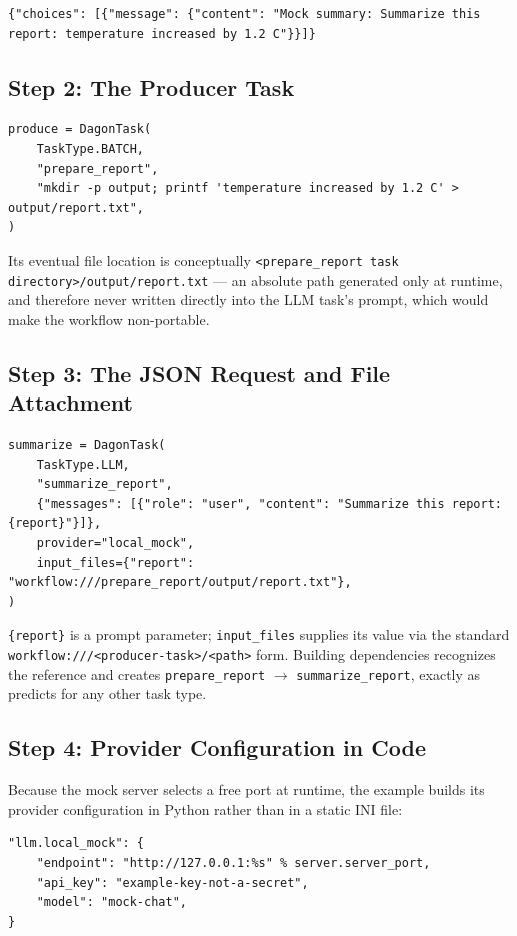 \begin{lstlisting}
{"choices": [{"message": {"content": "Mock summary: Summarize this report: temperature increased by 1.2 C"}}]}
\end{lstlisting}

\subsection{Step 2: The Producer Task}

\begin{lstlisting}
produce = DagonTask(
    TaskType.BATCH,
    "prepare_report",
    "mkdir -p output; printf 'temperature increased by 1.2 C' > output/report.txt",
)
\end{lstlisting}

Its eventual file location is conceptually
\texttt{<prepare\_report task directory>/output/report.txt} --- an absolute
path generated only at runtime, and therefore never written directly into
the LLM task's prompt, which would make the workflow non-portable.

\subsection{Step 3: The JSON Request and File Attachment}

\begin{lstlisting}
summarize = DagonTask(
    TaskType.LLM,
    "summarize_report",
    {"messages": [{"role": "user", "content": "Summarize this report: {report}"}]},
    provider="local_mock",
    input_files={"report": "workflow:///prepare_report/output/report.txt"},
)
\end{lstlisting}

\texttt{\{report\}} is a prompt parameter; \texttt{input\_files} supplies its
value via the standard \texttt{workflow:///<producer-task>/<path>} form.
Building dependencies recognizes the reference and creates
\texttt{prepare\_report} $\to$ \texttt{summarize\_report}, exactly as
 predicts for any other task type.

\subsection{Step 4: Provider Configuration in Code}

Because the mock server selects a free port at runtime, the example builds
its provider configuration in Python rather than in a static INI file:

\begin{lstlisting}
"llm.local_mock": {
    "endpoint": "http://127.0.0.1:%s" % server.server_port,
    "api_key": "example-key-not-a-secret",
    "model": "mock-chat",
}
\end{lstlisting}


